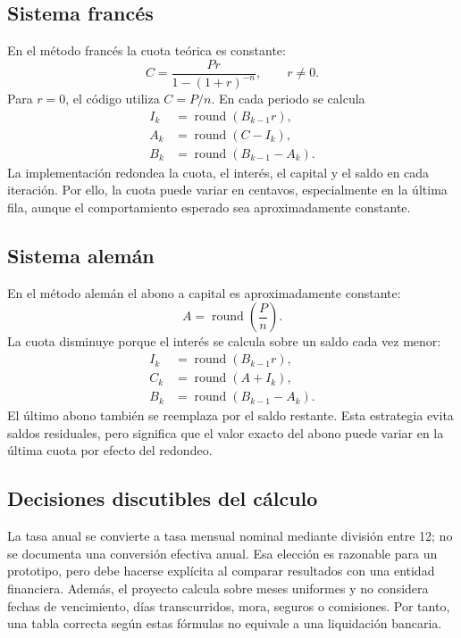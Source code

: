 \documentclass[12pt,a4paper]{article}
\begin{document}
\subsection{Sistema francés}

En el método francés la cuota teórica es constante:
\begin{equation}
C = \frac{P r}{1-(1+r)^{-n}}, \qquad r\ne 0.
\label{eq:frances}
\end{equation}
Para \(r=0\), el código utiliza \(C=P/n\). En cada periodo se calcula
\begin{align}
I_k &= \operatorname{round}(B_{k-1}r),\\
A_k &= \operatorname{round}(C-I_k),\\
B_k &= \operatorname{round}(B_{k-1}-A_k).
\end{align}
La implementación redondea la cuota, el interés, el capital y el saldo en
cada iteración. Por ello, la cuota puede variar en centavos, especialmente
en la última fila, aunque el comportamiento esperado sea aproximadamente
constante.

\subsection{Sistema alemán}

En el método alemán el abono a capital es aproximadamente constante:
\begin{equation}
A = \operatorname{round}\left(\frac{P}{n}\right).
\label{eq:aleman}
\end{equation}
La cuota disminuye porque el interés se calcula sobre un saldo cada vez menor:
\begin{align}
I_k &= \operatorname{round}(B_{k-1}r),\\
C_k &= \operatorname{round}(A+I_k),\\
B_k &= \operatorname{round}(B_{k-1}-A_k).
\end{align}
El último abono también se reemplaza por el saldo restante. Esta estrategia
evita saldos residuales, pero significa que el valor exacto del abono puede
variar en la última cuota por efecto del redondeo.

\subsection{Decisiones discutibles del cálculo}

La tasa anual se convierte a tasa mensual nominal mediante división entre
12; no se documenta una conversión efectiva anual. Esa elección es razonable
para un prototipo, pero debe hacerse explícita al comparar resultados con una
entidad financiera. Además, el proyecto calcula sobre meses uniformes y no
considera fechas de vencimiento, días transcurridos, mora, seguros o
comisiones. Por tanto, una tabla correcta según estas fórmulas no equivale a
una liquidación bancaria.
\end{document}
